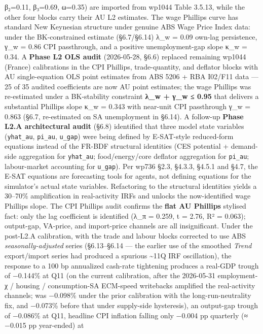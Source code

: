 \documentclass[
]{article}
\begin{document}
β₂=0.11, β₃=0.69, ω=0.35) are imported from wp1044 Table 3.5.13, while
the other four blocks carry their AU L2 estimates. The wage Phillips
curve has standard New Keynesian structure under genuine ABS Wage Price
Index data: under the BK-constrained estimate (§6.7/§6.14) λ\_w = 0.09
own-lag persistence, γ\_w = 0.86 CPI passthrough, and a positive
unemployment-gap slope κ\_w = 0.34. A \textbf{Phase L2 OLS audit}
(2026-05-28, §6.6) replaced remaining wp1044 (France) calibrations in
the CPI Phillips, trade-quantity, and deflator blocks with AU
single-equation OLS point estimates from ABS 5206 + RBA I02/F11 data ---
25 of 35 audited coefficients are now AU point estimates; the wage
Phillips was re-estimated under a BK-stability constraint \textbf{λ\_w +
γ\_w ≤ 0.95} that delivers a substantial Phillips slope κ\_w = 0.343
with near-unit CPI passthrough γ\_w = 0.863 (§6.7, re-estimated on SA
unemployment in §6.14). A follow-up \textbf{Phase L2.A architectural
audit} (§6.8) identified that three model state variables
(\texttt{yhat\_au}, \texttt{pi\_au}, \texttt{u\_gap}) were being defined
by E-SAT-style reduced-form equations instead of the FR-BDF structural
identities (CES potential + demand-side aggregation for
\texttt{yhat\_au}; food/energy/core deflator aggregation for
\texttt{pi\_au}; labour-market accounting for \texttt{u\_gap}). Per
wp736 §2.3, §4.3.3, §4.5.1 and §4.7, the E-SAT equations are forecasting
tools for agents, not defining equations for the simulator's actual
state variables. Refactoring to the structural identities yields a
30--70\% amplification in real-activity IRFs and unlocks the
now-identified wage Phillips slope. The CPI Phillips audit confirms the
\textbf{flat AU Phillips} stylised fact: only the lag coefficient is
identified (λ\_π = 0.259, t = 2.76, R² = 0.063); output-gap, VA-price,
and import-price channels are all insignificant. Under the post-L2.A
calibration, with the trade and labour blocks corrected to use ABS
\emph{seasonally-adjusted} series (§6.13--§6.14 --- the earlier use of
the smoothed \emph{Trend} export/import series had produced a spurious
\textasciitilde11Q IRF oscillation), the response to a 100 bp annualized
cash-rate tightening produces a real-GDP trough of −0.144\% at Q11 (on
the current calibration, after the 2026-05-31 employment-χ / housing /
consumption-SA ECM-speed writebacks amplified the real-activity
channels; was −0.098\% under the prior calibration with the
long-run-neutrality fix, and −0.073\% before that under supply-side
hysteresis), an output-gap trough of −0.086\% at Q11, headline CPI
inflation falling only −0.004 pp quarterly (≈ −0.015 pp year-ended) at
\end{document}
